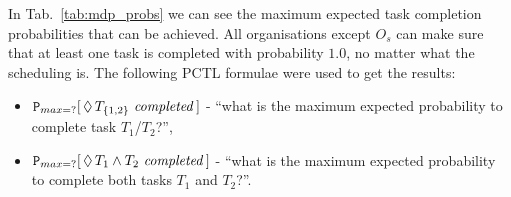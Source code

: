 \documentclass{llncs}
\begin{document}
In Tab.~\ref{tab:mdp_probs} we can see the maximum expected task completion probabilities that can be achieved. All organisations except $O_s$ can make sure that at least one task is completed with probability $1.0$, no matter what the scheduling is. The following PCTL formulae were used to get the results:
\begin{itemize}
 \item ${\tt P}_{max=?}[\,\Diamond\,T_{\{1,2\}} \mathit{\ completed}\,]$ -
``what is the maximum expected probability to complete  task $T_1$/$T_2$?'',
 \item ${\tt P}_{max=?}[\,\Diamond\,T_{1} \wedge T_2 \mathit{\ completed}\,]$ -
``what is the maximum expected probability to complete  both tasks $T_1$ and $T_2$?''.
\end{itemize}



\begin{table}
\centering
{}
\caption{Maximal rewards that can be achieved by agent organisations from Fig.~\ref{fig:network_configurations} using Alg.~\ref{alg:join_team_nondet}'s offline and online versions defined in Alg.~\ref{alg:main_process}.}
\label{tab:mdp_rewards}
\end{table}
\end{document}
